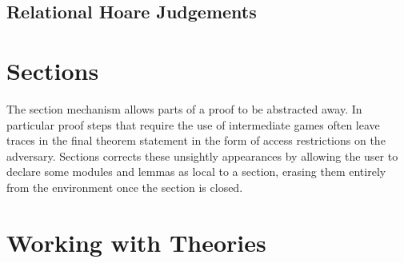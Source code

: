 %
%

\subsection{Relational Hoare Judgements}

\section{Sections}
The section mechanism allows parts of a proof to be abstracted away. In
particular proof steps that require the use of intermediate games often leave
traces in the final theorem statement in the form of access restrictions on the
adversary. Sections corrects these unsightly appearances by allowing the user
to declare some modules and lemmas as local to a section, erasing them entirely
from the environment once the section is closed.


\section{Working with Theories\label{sec:cloning}}

\subsection{}




